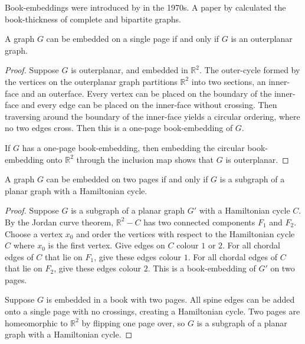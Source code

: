 Book-embeddings were introduced by \textcite{kainenRecentResultsTopological1974, ollmannBookThicknessVarious1973} in the 1970s. A paper by \textcite{bernhartBookThicknessGraph1979} calculated the book-thickness of complete and bipartite graphs.
\begin{proposition}\label{lem:Pagenumber_1}
	A graph \(G\) can be embedded on a single page if and only if \(G\) is an outerplanar graph.
\end{proposition}
\begin{proof}
	Suppose $G$ is outerplanar, and embedded in $\mathbb{R}^2$. The outer-cycle formed by the vertices on the outerplanar graph partitions $\mathbb{R}^2$ into two sections, an inner-face and an outerface. Every vertex can be placed on the boundary of the inner-face and every edge can be placed on the inner-face without crossing. Then traversing around the boundary of the inner-face yields a circular ordering, where no two edges cross. Then this is a one-page book-embedding of $G$. 

	If $G$ has a one-page book-embedding, then embedding the circular book-embedding onto $\mathbb{R}^2$ through the inclusion map shows that $G$ is outerplanar. 
\end{proof}
\begin{proposition}\label{lem:Pagenumber_2}
	A graph \(G\) can be embedded on two pages if and only if \(G\) is a subgraph of a planar graph with a Hamiltonian cycle.
\end{proposition}

\begin{proof}
	Suppose $G$ is a subgraph of a planar graph $G'$ with a Hamiltonian cycle $C$. By the Jordan curve theorem, $\mathbb{R}^2 - C$ has two connected components $F_1$ and $F_2$. Choose a vertex $x_0$ and order the vertices with respect to the Hamiltonian cycle $C$ where $x_0$ is the first vertex. Give edges on $C$ colour $1$ or $2$. For all chordal edges of $C$ that lie on $F_1$, give these edges colour $1$. For all chordal edges of $C$ that lie on $F_2$, give these edges colour $2$. This is a book-embedding of $G'$ on two pages. 

	Suppose $G$ is embedded in a book with two pages. All spine edges can be added onto a single page with no crossings, creating a Hamiltonian cycle. Two pages are homeomorphic to $\mathbb{R}^2$ by flipping one page over, so $G$ is a subgraph of a planar graph with a Hamiltonian cycle. 
\end{proof}
